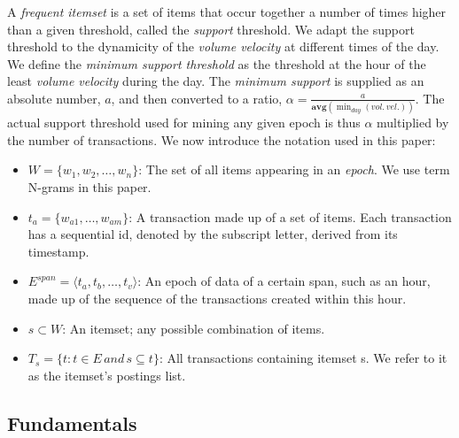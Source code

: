 \documentclass{sig-alternate}
\begin{document}
A \emph{frequent itemset} is a set of items that occur together a number of
times higher than a given threshold, called the \emph{support} threshold.
We adapt the support threshold to the dynamicity of the \emph{volume velocity} at
different times of the day.
We define the \emph{minimum support threshold} as the threshold at the hour
of the least \emph{volume velocity} during the day.
The \emph{minimum support} is supplied as an absolute number, $a$, and then
converted to a ratio, $\alpha = \frac{a}{\textbf{avg}(\min_{day}{(vol.\, vel.)})}$.
The actual support threshold used for mining any given epoch is thus
$\alpha$ multiplied by the number of transactions. %
We now introduce the notation used in this paper:
\begin{itemize}
\item $W = \{w_1,w_2,\ldots, w_n\}$: The set of all items appearing in an \emph{epoch}. 
We use term N-grams in this paper.
\item $t_a = \{w_{a1},\ldots, w_{am}\}$: A transaction made up of a set of items. Each transaction has a sequential id, denoted by the subscript letter, derived from its timestamp.
\item $E^{span} = \langle t_a, t_b, \ldots, t_v\rangle$: An epoch of data of a certain span, such as an hour, made up of the sequence of the transactions created within this hour.
\item $s \subset W$: An itemset; any possible combination of items. 
\item $T_s = \{t: t \in E \, and \, s \subseteq t\}$: All transactions containing itemset s. We refer to it as the itemset's postings list.
\end{itemize}

\subsection{Fundamentals}
\end{document}

